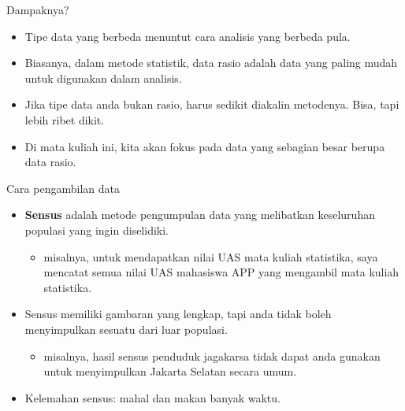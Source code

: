 \documentclass[
  ignorenonframetext,
]{beamer}
\providecommand{\tightlist}{%
  \setlength{\itemsep}{0pt}\setlength{\parskip}{0pt}}\usepackage{longtable,booktabs,array}
\begin{document}
\begin{frame}{Dampaknya?}
\label{dampaknya}
\begin{itemize}
\item
  Tipe data yang berbeda menuntut cara analisis yang berbeda pula.
\item
  Biasanya, dalam metode statistik, data rasio adalah data yang paling
  mudah untuk digunakan dalam analisis.
\item
  Jika tipe data anda bukan rasio, harus sedikit diakalin metodenya.
  Bisa, tapi lebih ribet dikit.
\item
  Di mata kuliah ini, kita akan fokus pada data yang sebagian besar
  berupa data rasio.
\end{itemize}
\end{frame}

\begin{frame}{Cara pengambilan data}
\label{cara-pengambilan-data}
\begin{itemize}
\item
  \textbf{Sensus} adalah metode pengumpulan data yang melibatkan
  keseluruhan populasi yang ingin diselidiki.

  \begin{itemize}
  \tightlist
  \item
    misalnya, untuk mendapatkan nilai UAS mata kuliah statistika, saya
    mencatat semua nilai UAS mahasiswa APP yang mengambil mata kuliah
    statistika.
  \end{itemize}
\item
  Sensus memiliki gambaran yang lengkap, tapi anda tidak boleh
  menyimpulkan sesuatu dari luar populasi.

  \begin{itemize}
  \tightlist
  \item
    misalnya, hasil sensus penduduk jagakarsa tidak dapat anda gunakan
    untuk menyimpulkan Jakarta Selatan secara umum.
  \end{itemize}
\item
  Kelemahan sensus: mahal dan makan banyak waktu.
\end{itemize}
\end{frame}
\end{document}
